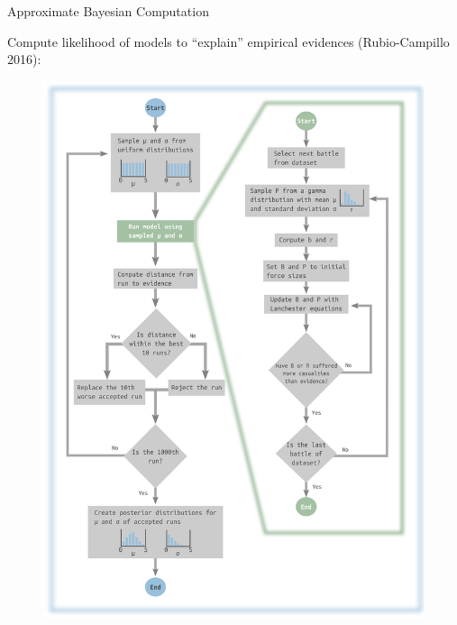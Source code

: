 \documentclass[12pt, notes=show]{beamer}
\begin{document}
	\begin{frame}{Approximate Bayesian Computation}

	    Compute likelihood of models to ``explain'' empirical evidences (Rubio-Campillo 2016):
	    \begin{figure}[H]
		\begin{center}
		    \includegraphics[height=.7\textheight]{Fig-4-Flowchart-for-the-ABC-frameworkExample-for-a-experiment-using-1000-runs-and.png}
		\end{center}
	    \end{figure}
	    

	\end{frame}
\end{document}
